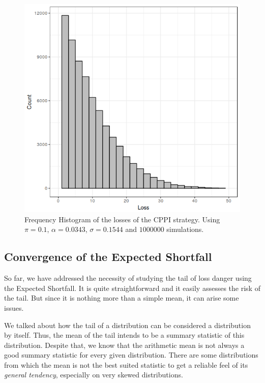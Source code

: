 \begin{figure}[h]
    \centering
    \includegraphics[scale=0.5]{images/cppi-losses-hist.png}
    \caption{Frequency Histogram of the losses of the CPPI strategy. Using $\pi = 0.1$, $\alpha = 0.0343$, $\sigma = 0.1544$ and $1000000$ simulations.}
    \label{fig:lm-tails}
\end{figure}




\subsection{Convergence of the Expected Shortfall}

So far, we have addressed the necessity of studying the tail of loss danger using the Expected Shortfall. It is quite straightforward and it easily assesses the risk of the tail. But since it is nothing more than a simple mean, it can arise some issues. 

We talked about how the tail of a distribution can be considered a distribution by itself. Thus, the mean of the tail intends to be a summary statistic of this distribution. Despite that, we know that the arithmetic mean is not always a good summary statistic for every given distribution. There are some distributions from which the mean is not the best suited statistic to get a reliable feel of its \emph{general tendency}, especially on very skewed distributions.

